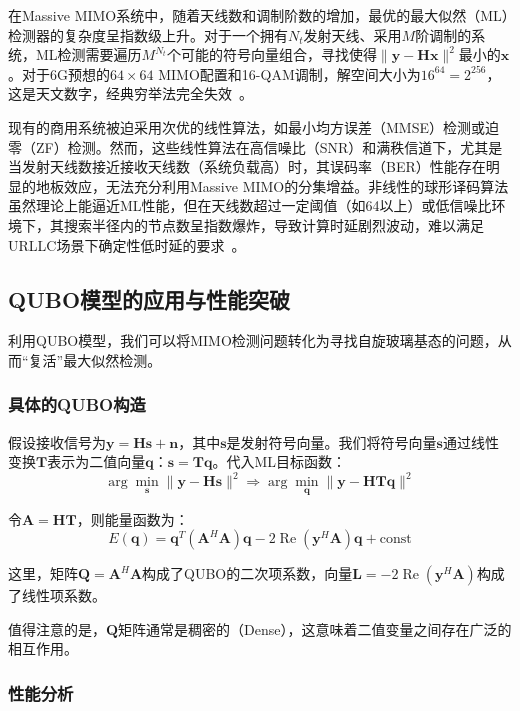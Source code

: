 \documentclass[12pt,a4paper]{article}
\newcommand{\bx}{\mathbf{x}}
\newcommand{\by}{\mathbf{y}}
\newcommand{\bH}{\mathbf{H}}
\newcommand{\bQ}{\mathbf{Q}}
\newcommand{\bs}{\mathbf{s}}
\newcommand{\bq}{\mathbf{q}}
\newcommand{\bT}{\mathbf{T}}
\newcommand{\bA}{\mathbf{A}}
\begin{document}
在Massive MIMO系统中，随着天线数和调制阶数的增加，最优的最大似然（ML）检测器的复杂度呈指数级上升。对于一个拥有$N_t$发射天线、采用$M$阶调制的系统，ML检测需要遍历$M^{N_t}$个可能的符号向量组合，寻找使得$\| \by - \bH\bx \|^2$最小的$\bx$。对于6G预想的$64 \times 64$ MIMO配置和16-QAM调制，解空间大小为$16^{64} = 2^{256}$，这是天文数字，经典穷举法完全失效~\cite{ref4}。

现有的商用系统被迫采用次优的线性算法，如最小均方误差（MMSE）检测或迫零（ZF）检测。然而，这些线性算法在高信噪比（SNR）和满秩信道下，尤其是当发射天线数接近接收天线数（系统负载高）时，其误码率（BER）性能存在明显的地板效应，无法充分利用Massive MIMO的分集增益。非线性的球形译码算法虽然理论上能逼近ML性能，但在天线数超过一定阈值（如64以上）或低信噪比环境下，其搜索半径内的节点数呈指数爆炸，导致计算时延剧烈波动，难以满足URLLC场景下确定性低时延的要求~\cite{ref6}。

\subsection{QUBO模型的应用与性能突破}

利用QUBO模型，我们可以将MIMO检测问题转化为寻找自旋玻璃基态的问题，从而``复活''最大似然检测。

\subsubsection{具体的QUBO构造}

假设接收信号为$\by = \bH\bs + \mathbf{n}$，其中$\bs$是发射符号向量。我们将符号向量$\bs$通过线性变换$\bT$表示为二值向量$\bq$：$\bs = \bT\bq$。代入ML目标函数：
\begin{equation}
\arg\min_{\bs} \| \by - \bH\bs \|^2 \Rightarrow \arg\min_{\bq} \| \by - \bH\bT\bq \|^2
\end{equation}

令$\bA = \bH\bT$，则能量函数为：
\begin{equation}
E(\bq) = \bq^T (\bA^H \bA) \bq - 2 \operatorname{Re}(\by^H \bA) \bq + \text{const}
\label{eq:mimo_qubo}
\end{equation}

这里，矩阵$\bQ = \bA^H \bA$构成了QUBO的二次项系数，向量$\mathbf{L} = -2 \operatorname{Re}(\by^H \bA)$构成了线性项系数。

值得注意的是，$\bQ$矩阵通常是稠密的（Dense），这意味着二值变量之间存在广泛的相互作用。

\subsubsection{性能分析}
\end{document}
